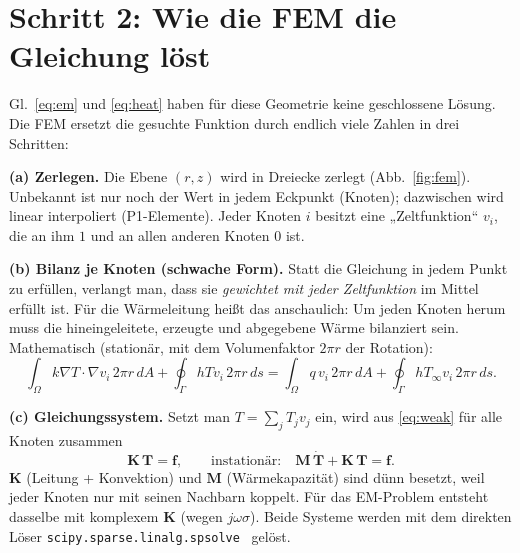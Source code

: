\documentclass[a4paper, 10pt, conference]{ieeeconf}
\theoremstyle{remark}
\begin{document}
\section{Schritt 2: Wie die FEM die Gleichung löst}
\label{sec:fem}

Gl.~\eqref{eq:em} und \eqref{eq:heat} haben für diese Geometrie keine
geschlossene Lösung. Die FEM ersetzt die gesuchte Funktion durch endlich
viele Zahlen in drei Schritten:

\textbf{(a) Zerlegen.} Die Ebene $(r,z)$ wird in Dreiecke zerlegt
(Abb.~\ref{fig:fem}). Unbekannt ist nur noch der Wert in jedem
Eckpunkt (Knoten); dazwischen wird linear interpoliert (P1-Elemente). Jeder
Knoten $i$ besitzt eine „Zeltfunktion“ $v_i$, die an ihm $1$ und an allen
anderen Knoten $0$ ist.

\textbf{(b) Bilanz je Knoten (schwache Form).} Statt die Gleichung in
jedem Punkt zu erfüllen, verlangt man, dass sie \emph{gewichtet mit jeder
Zeltfunktion} im Mittel erfüllt ist. Für die Wärmeleitung heißt das
anschaulich: Um jeden Knoten herum muss die hineingeleitete, erzeugte und
abgegebene Wärme bilanziert sein. Mathematisch (stationär, mit dem
Volumenfaktor $2\pi r$ der Rotation):
\begin{equation}
  \int_\Omega k\nabla T\!\cdot\!\nabla v_i\,2\pi r\,dA
  +\oint_\Gamma hTv_i\,2\pi r\,ds
  =\int_\Omega q\,v_i\,2\pi r\,dA+\oint_\Gamma hT_\infty v_i\,2\pi r\,ds .
  \label{eq:weak}
\end{equation}

\textbf{(c) Gleichungssystem.} Setzt man $T=\sum_j T_jv_j$ ein, wird
aus \eqref{eq:weak} für alle Knoten zusammen
\begin{equation}
  \mathbf K\,\mathbf T=\mathbf f,
  \qquad\text{instationär:}\quad
  \mathbf M\,\dot{\mathbf T}+\mathbf K\,\mathbf T=\mathbf f .
  \label{eq:linsys}
\end{equation}
$\mathbf K$ (Leitung + Konvektion) und $\mathbf M$ (Wärmekapazität) sind
dünn besetzt, weil jeder Knoten nur mit seinen Nachbarn koppelt. Für das
EM-Problem entsteht dasselbe mit komplexem $\mathbf K$ (wegen
$j\omega\sigma$). Beide Systeme werden mit dem direkten Löser
\texttt{scipy.sparse.linalg.spsolve}~\cite{virtanen2020scipy} gelöst.
\end{document}
